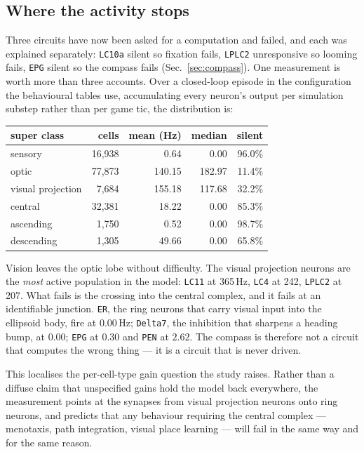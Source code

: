 \documentclass[10pt,twoside]{article}
\newcommand{\cell}[1]{\texttt{#1}}
\begin{document}
\subsection{Where the activity stops}
\label{sec:silence}

Three circuits have now been asked for a computation and failed, and each was
explained separately: \cell{LC10a} silent so fixation fails, \cell{LPLC2}
unresponsive so looming fails, \cell{EPG} silent so the compass fails
(Sec.~\ref{sec:compass}). One measurement is worth more than three accounts.
Over a closed-loop episode in the configuration the behavioural tables use,
accumulating every neuron's output per simulation substep rather than per game
tic, the distribution is:

\begin{center}
\small
\begin{tabular}{lrrrr}
\toprule
super class & cells & mean (Hz) & median & silent\\
\midrule
sensory            & 16{,}938 & 0.64 & 0.00 & 96.0\%\\
optic              & 77{,}873 & 140.15 & 182.97 & 11.4\%\\
visual projection  & 7{,}684 & 155.18 & 117.68 & 32.2\%\\
central            & 32{,}381 & 18.22 & 0.00 & 85.3\%\\
ascending          & 1{,}750 & 0.52 & 0.00 & 98.7\%\\
descending         & 1{,}305 & 49.66 & 0.00 & 65.8\%\\
\bottomrule
\end{tabular}
\end{center}

Vision leaves the optic lobe without difficulty. The visual projection neurons
are the \emph{most} active population in the model: \cell{LC11} at 365\,Hz,
\cell{LC4} at 242, \cell{LPLC2} at 207. What fails is the crossing into the
central complex, and it fails at an identifiable junction. \cell{ER}, the ring
neurons that carry visual input into the ellipsoid body, fire at $0.00$\,Hz;
\cell{Delta7}, the inhibition that sharpens a heading bump, at $0.00$;
\cell{EPG} at $0.30$ and \cell{PEN} at $2.62$. The compass is therefore not a
circuit that computes the wrong thing --- it is a circuit that is never driven.

This localises the per-cell-type gain question the study raises. Rather than a
diffuse claim that unspecified gains hold the model back everywhere, the
measurement points at the synapses from visual projection neurons onto ring
neurons, and predicts that any behaviour requiring the central complex ---
menotaxis, path integration, visual place learning --- will fail in the same
way and for the same reason.
\end{document}
